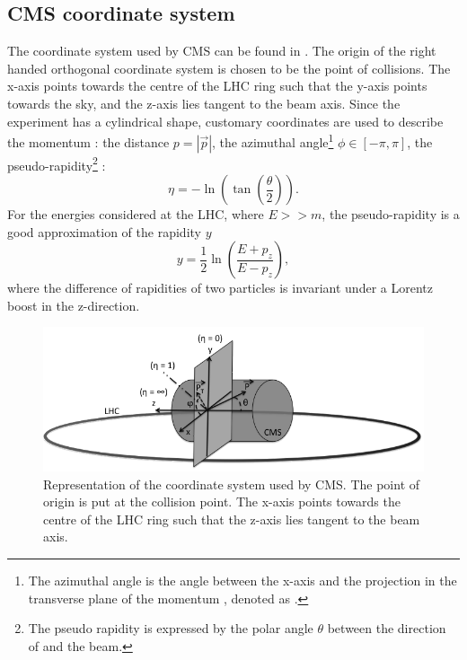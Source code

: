 \subsection{CMS coordinate system}
The coordinate system used by CMS can be found in . The origin of the right handed orthogonal coordinate system is chosen to be the point of collisions. The x-axis points towards the centre of the LHC ring such that the y-axis points towards the sky, and the z-axis lies tangent to the beam axis. Since the experiment has a cylindrical shape, customary coordinates are used to describe the momentum \impuls: the distance $p=|\vec{p}|$, the azimuthal angle\footnote{The azimuthal angle is the angle between the x-axis and the projection in the transverse plane of the momentum \impuls, denoted as \trimpuls. } $\phi \in \left[-\pi,\pi\right]$, the pseudo-rapidity\footnote{The pseudo rapidity  is expressed by the polar angle $\theta$ between the direction of \impuls and the beam.} \psrap: 
\begin{equation}
\eta = - \ln \left(\tan \left(\frac{\theta}{2}\right)\right).
\end{equation}
For the energies considered at the LHC, where $E >> m$, the pseudo-rapidity is a good approximation of the rapidity $y$
\begin{equation}
y = \frac{1}{2} \ln \left(\frac{E + p_z}{E - p_z}\right), 
\end{equation}
where the difference of rapidities of two particles is invariant under a Lorentz boost in the z-direction.
 \begin{figure}[htbp]
	\centering
	\includegraphics[width=1.\linewidth]{2_ExperimentalSetup/Figures/imageedit_1_9146672677}
	\caption{Representation of the coordinate system used by CMS. The point of origin is put at the collision point. The x-axis points towards the centre of the LHC ring such that the z-axis lies tangent to the beam axis. }
	\label{fig:CMScoord}
\end{figure}
\newpage

